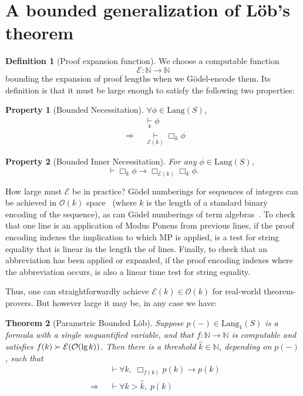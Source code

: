 \documentclass[onecolumn]{miri-tech-article}
\newtheorem{theorem}{Theorem}
\newtheorem{property}{Property}
\numberwithin{equation}{section}
\theoremstyle{definition}
\newtheorem{definition}[theorem]{Definition}
\newcommand{\NN}{\mathbb{N}}
\newcommand{\Ee}{\mathcal{E}}
\newcommand{\Oo}{\mathcal{O}}
\newcommand{\proves}[1]{\underset{#1}{\vdash}}
\newcommand{\bx}[1]{\Box_{#1}}
\newcommand{\Lang}{\mathrm{Lang}}
\renewcommand{\implies}{\rightarrow}
\renewcommand{\to}{\rightarrow}
\newcommand{\Implies}{\;\;\Rightarrow\;\;}
\renewcommand{\lg}{\mathrm{lg\hspace{0.3ex}}}
\renewcommand{\-}{^{-1}}
\begin{document}
\section{A bounded generalization of L\"{o}b's theorem}\label{sec:blob}

\begin{definition}[Proof expansion function]\label{def:E}We choose a computable function $$\Ee:\NN\to\NN$$ bounding the expansion of proof lengths when we G\"{o}del-encode them.  Its definition is that it must be large enough to satisfy the following two properties:
\end{definition}

\begin{property}[Bounded Necessitation]
$\forall \phi \in \Lang(S)$,
\begin{align}
             &\proves{k} \phi \\
\Implies &\proves{\Ee (k)} \bx{k} \phi
\end{align}
\end{property}
\begin{property}[Bounded Inner Necessitation]
For any $\phi \in \Lang(S)$,
$$\proves{} \bx{k}\phi \implies \bx{\Ee (k)}\bx{k}\phi.$$
\end{property}

\noindent {\bf Achieving $\Ee(k)\in \Oo(k)$.}  How large must $\Ee$ be in practice?  G\"{o}del numberings for sequences of integers can be achieved in $\Oo(k)$ space~\cite{Tsai:2002} (where $k$ is the length of a standard binary encoding of the sequence), as can G\"{o}del numberings of term algebras~\cite{Tarau:2013}.  To check that one line is an application of Modus Ponens from previous lines, if the proof encoding indexes the implication to which MP is applied, is a test for string equality that is linear in the length the of lines.  Finally, to check that an abbreviation has been applied or expanded, if the proof encoding indexes where the abbreviation occurs, is also a linear time test for string equality.  

Thus, one can straightforwardly achieve $\Ee(k) \in \Oo(k)$ for real-world theorem-provers.  But however large it may be, in any case we have:

\begin{theorem}[Parametric Bounded L\"{o}b]\label{thm:pblob}
Suppose $p(-)\in\Lang_1(S)$ is a formula with a single unquantified variable, and that $f:\NN \to \NN$ is computable and satisfies $f(k) \succ \Ee(\Oo(\lg k))$.  Then there is a threshold $\hat k \in \NN$, depending on $p(-)$, such that
\begin{align*}
             &\proves{} \forall k,\; \bx{f(k)}p(k) \implies p(k)\\
\Implies &\proves{} \forall k>\hat k, \; p(k)
\end{align*}
\end{theorem}
\end{document}
